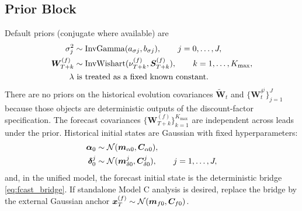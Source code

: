 \subsection{Prior Block}
Default priors (conjugate where available) are
\begin{align}
\sigma_j^2 &\sim \mathrm{InvGamma}(a_{\sigma j},b_{\sigma j}),\qquad j=0,\dots,J, \label{eq:prior_sigma}\\
\bm W_{T+k}^{(f)} &\sim \mathrm{InvWishart}(\nu_{T+k}^{(f)},\bm S_{T+k}^{(f)}),\qquad k=1,\dots,K_{\max}, \label{eq:prior_W_fcast}\\
\lambda &\text{ is treated as a fixed known constant.} \label{eq:lambda_fixed}
\end{align}
There are no priors on the historical evolution covariances
$\tilde{\bm W}_t$ and $\{\bm W_t^{\delta^j}\}_{j=1}^J$ because those objects are deterministic
outputs of the discount-factor specification.
The forecast covariances $\{\bm W_{T+k}^{(f)}\}_{k=1}^{K_{\max}}$ are independent across leads
under the prior.
Historical initial states are Gaussian with fixed hyperparameters:
\begin{align}
\bm\alpha_0&\sim\mathcal{N}(\bm m_{\alpha0},\bm C_{\alpha0}), \\
\bm\delta_0^j&\sim\mathcal{N}(\bm m_{\delta0}^j,\bm C_{\delta0}^j), \qquad j=1,\dots,J,
\end{align}
and, in the unified model, the forecast initial state is the deterministic bridge
\eqref{eq:fcast_bridge}.
If standalone Model C analysis is desired, replace the bridge by the external Gaussian anchor
$\bm x_T^{(f)}\sim\mathcal{N}(\bm m_{f0},\bm C_{f0})$.
